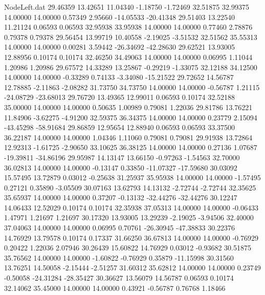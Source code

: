 \begin{filecontents}{NodeLeft.dat}
  29.46359   13.42651   11.04340    -1.18750   -1.72469   32.51875   32.99375   14.00000   14.00000    0.57349    2.95660  -14.05533  -20.41348
  29.51403   13.22540   11.21124     0.06593    0.06593   32.95938   33.95938   14.00000   14.00000    0.77460    2.78876    0.79378    0.79378
  29.56454   13.99719   10.40558    -2.19025   -3.51532   32.51562   35.55313   14.00000   14.00000    0.00281    3.59442  -26.34692  -42.28630
  29.62521   13.93005   12.88956     0.10174    0.10174   32.46250   34.49063   14.00000   14.00000    0.06995    1.11044    1.20986    1.20986
  29.67572   14.33289   13.25867    -0.29219   -1.33075   32.12188   34.12500   14.00000   14.00000   -0.33289    0.74133   -3.34080  -15.21522
  29.72652   14.56787   12.78885    -2.11863   -2.08282   31.73750   34.73750   14.00000   14.00000   -0.56787    1.21115  -24.08729  -23.68013
  29.76720   13.49365   12.99011     0.06593    0.10174   32.52188   35.00000   14.00000   14.00000    0.50635    1.00989    0.79081    1.22036
  29.81786   13.76221   11.84906    -3.62275   -4.91200   32.59375   36.34375   14.00000   14.00000    0.23779    2.15094  -43.45298  -58.91684
  29.86859   12.95654   12.88940     0.06593    0.06593   33.37500   36.22187   14.00000   14.00000    1.04346    1.11060    0.79081    0.79081
  29.91938   13.72864   12.92313    -1.61725   -2.90650   33.10625   36.38125   14.00000   14.00000    0.27136    1.07687  -19.39811  -34.86196
  29.95987   14.13147   13.66150    -0.97263   -1.54563   32.70000   36.02813   14.00000   14.00000   -0.13147    0.33850  -11.07327  -17.59680
  30.03092   15.57495   13.72879     0.03012   -0.25638   31.25937   35.95938   14.00000   14.00000   -1.57495    0.27121    0.35890   -3.05509
  30.07163   13.62793   14.13132    -2.72744   -2.72744   32.35625   35.65937   14.00000   14.00000    0.37207   -0.13132  -32.44276  -32.44276
  30.12247   14.06433   12.52029     0.10174    0.10174   32.35938   37.05313   14.00000   14.00000   -0.06433    1.47971    1.21697    1.21697
  30.17320   13.93005   13.29239    -2.19025   -3.94506   32.40000   37.04063   14.00000   14.00000    0.06995    0.70761  -26.30945  -47.38833
  30.22376   14.76929   13.79578     0.10174    0.17337   31.66250   36.67813   14.00000   14.00000   -0.76929    0.20422    1.22036    2.07946
  30.26439   15.60822   14.76929     0.03012   -0.93682   30.51875   35.76562   14.00000   14.00000   -1.60822   -0.76929    0.35879  -11.15998
  30.31560   13.76251   14.50058    -2.15444   -2.51257   31.60312   35.62812   14.00000   14.00000    0.23749   -0.50058  -24.31284  -28.35427
  30.36627   13.56079   14.56787     0.06593    0.10174   32.14062   35.45000   14.00000   14.00000    0.43921   -0.56787    0.76768    1.18466

\end{filecontents}

